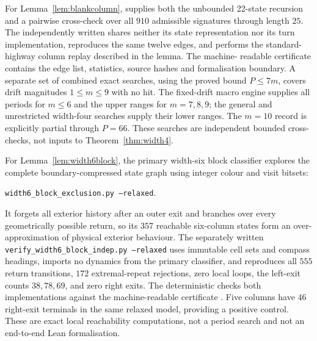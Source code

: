 \documentclass[11pt,letterpaper]{article}
\theoremstyle{plain}
\theoremstyle{definition}
\begin{document}
\begin{NoHyper}
For Lemma~\ref{lem:blankcolumn},  supplies both
the unbounded 22-state recursion and a pairwise cross-check over all $910$ admissible
signatures through length $25$.  The independently written
 shares neither its state
representation nor its turn implementation, reproduces the same twelve edges, and
performs the standard-highway column replay described in the lemma.  The machine-
readable certificate  contains the
edge list, statistics, source hashes and formalisation boundary.  A separate
set of combined exact searches, using the proved bound $P\le7m$, covers drift
magnitudes $1\le m\le9$ with no hit.  The fixed-drift macro engine supplies all
periods for $m\le6$ and the upper ranges for $m=7,8,9$; the general and unrestricted
width-four searches supply their lower ranges.  The $m=10$ record is explicitly
partial through $P=66$.  These searches are independent bounded cross-checks, not inputs to
Theorem~\ref{thm:width4}.

For Lemma~\ref{lem:width6block}, the primary width-six block classifier explores the
complete boundary-compressed state graph using integer colour and visit bitsets:
\begin{center}
\texttt{width6\_block\_exclusion.py --relaxed}.
\end{center}
It forgets
all exterior history after an outer exit and branches over every geometrically
possible return, so its $357$ reachable six-column states form an over-approximation
of physical exterior behaviour.  The separately written
\texttt{verify\_\allowbreak width6\_\allowbreak block\_\allowbreak indep.py --relaxed}
uses immutable cell sets and
compass headings, imports no dynamics from the primary classifier, and reproduces
all $555$ return transitions, $172$ extremal-repeat rejections, zero local loops,
the left-exit counts $38,78,69$, and zero right exits.  The deterministic
 checks both implementations
against the machine-readable certificate
.  Five
columns have $46$ right-exit terminals in the same relaxed model, providing a
positive control.  These are exact local reachability computations, not a period
search and not an end-to-end Lean formalisation.


\end{NoHyper}
\end{document}
